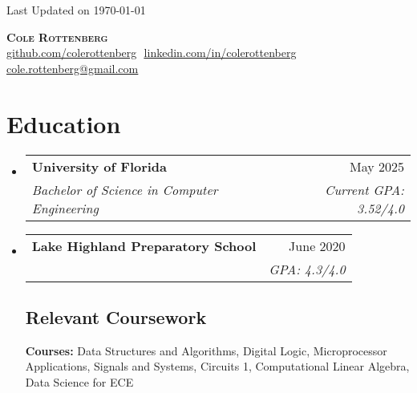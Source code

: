 \documentclass[letterpaper,11pt]{article}
\makeatletter
\newcommand{\resumeSubheading}[4]{
  \vspace{-2pt}\item
    \begin{tabular*}{0.97\textwidth}[t]{l@{\extracolsep{\fill}}r}
      \textbf{#1} & #2 \\
      \textit{\small#3} & \textit{\small #4} \\
    \end{tabular*}\vspace{-7pt}
}
\newcommand{\resumeSubHeadingListStart}{\begin{itemize}[leftmargin=0.15in, label={}]}
\newcommand{\resumeSubHeadingListEnd}{\end{itemize}}
\makeatother
\begin{document}
\begin{flushright}
  \vspace{-4pt}
  \color{gray}
  \item
  Last Updated on \today 
\end{flushright}

\vspace{-7pt}

\begin{center}
    \textbf{\Large \scshape Cole Rottenberg } \\ \vspace{8pt}
    \small 
    \href{https://github.com/johnDoe}{\underline{github.com/colerottenberg}} $  $
    \href{https://linkedin.com/in/colerottenberg}{\underline{linkedin.com/in/colerottenberg}} $  $
    \href{mailto:cole.rottenberg@gmail.com}
    {\underline{cole.rottenberg@gmail.com}}
\end{center}

\section{Education}
  \resumeSubHeadingListStart
  
    \resumeSubheading
      {University of Florida}{May 2025}
      {Bachelor of Science in Computer Engineering}{Current GPA: 3.52/4.0}
      
    \resumeSubheading
      {Lake Highland Preparatory School }{June 2020}
      {}{GPA: 4.3/4.0}

    \vspace{-10pt}
    \subsection{Relevant Coursework}
      \textbf{Courses:} Data Structures and Algorithms, Digital Logic, Microprocessor Applications, Signals and Systems, Circuits 1, Computational Linear Algebra, Data Science for ECE\\

  \resumeSubHeadingListEnd

\end{document}
